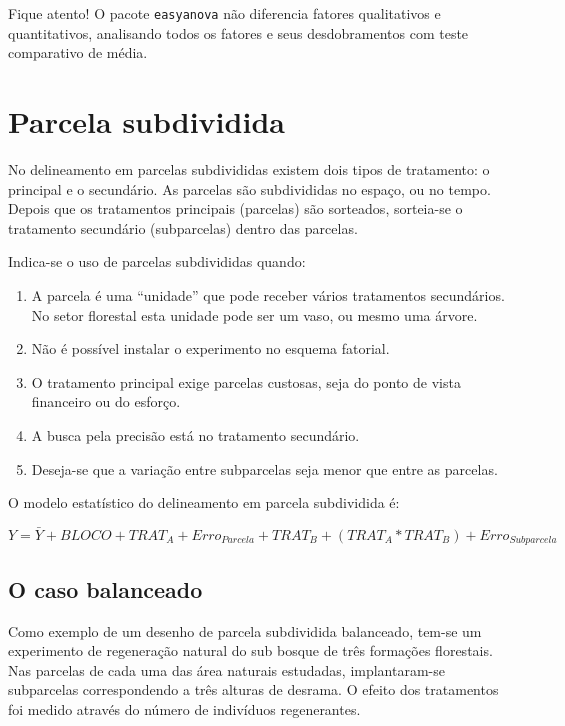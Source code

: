 \documentclass[
]{article}
\providecommand{\tightlist}{%
  \setlength{\itemsep}{0pt}\setlength{\parskip}{0pt}}
\begin{document}
Fique atento! O pacote \texttt{easyanova} não diferencia fatores qualitativos e quantitativos, analisando todos os fatores e seus desdobramentos com teste comparativo de média.

\hypertarget{parcela-subdividida}{%
\section{Parcela subdividida}\label{parcela-subdividida}}

No delineamento em parcelas subdivididas existem dois tipos de tratamento: o principal e o secundário. As parcelas são subdivididas no espaço, ou no tempo. Depois que os tratamentos principais (parcelas) são sorteados, sorteia-se o tratamento secundário (subparcelas) dentro das parcelas.

Indica-se o uso de parcelas subdivididas quando:

\begin{enumerate}
\def\labelenumi{\arabic{enumi}.}
\tightlist
\item
  A parcela é uma ``unidade'' que pode receber vários tratamentos secundários. No setor florestal esta unidade pode ser um vaso, ou mesmo uma árvore.
\item
  Não é possível instalar o experimento no esquema fatorial.
\item
  O tratamento principal exige parcelas custosas, seja do ponto de vista financeiro ou do esforço.
\item
  A busca pela precisão está no tratamento secundário.
\item
  Deseja-se que a variação entre subparcelas seja menor que entre as parcelas.
\end{enumerate}

O modelo estatístico do delineamento em parcela subdividida é:

\[Y = \bar{Y} + BLOCO + TRAT_A + Erro_{Parcela} + TRAT_B + (TRAT_A * TRAT_B) + Erro_{Subparcela}\]

\hypertarget{o-caso-balanceado-4}{%
\subsection{O caso balanceado}\label{o-caso-balanceado-4}}

Como exemplo de um desenho de parcela subdividida balanceado, tem-se um experimento de regeneração natural do sub bosque de três formações florestais. Nas parcelas de cada uma das área naturais estudadas, implantaram-se subparcelas correspondendo a três alturas de desrama. O efeito dos tratamentos foi medido através do número de indivíduos regenerantes.
\end{document}
